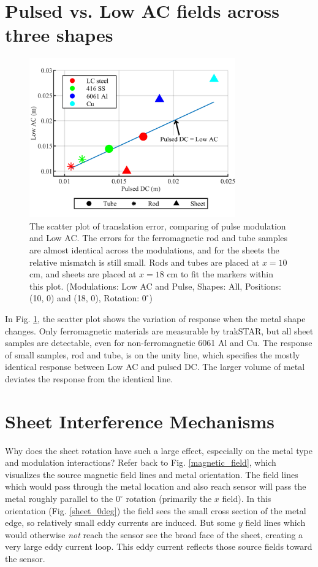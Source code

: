 \documentclass{article}
\begin{document}
\section{Pulsed vs. Low AC fields across three shapes}
\label{supplement:pulse_Low}

\begin{figure}[!htbp]
\centerline{\includegraphics[width= 3.5in]{chaicS2.png}}
\caption{The scatter plot of translation error, comparing of pulse modulation and Low AC. The errors for the ferromagnetic rod and tube samples are almost identical across the modulations, and for the sheets the relative mismatch is still small.  Rods and tubes are placed at $x=10$ cm, and sheets are placed at $x=18$ cm to fit the markers within this plot.
(Modulations: Low AC and Pulse, Shapes: All, Positions: (10, 0) and (18, 0), Rotation: $0^\circ$)}
\label{3DGuidance_Low_compare}
\end{figure} 

In Fig. \ref{3DGuidance_Low_compare}, the scatter plot shows the variation of response when the metal shape changes. Only ferromagnetic materials are measurable by trakSTAR, but all sheet samples are detectable, even for non-ferromagnetic 6061 Al and Cu. The response of small samples, rod and tube, is on the unity line, which specifies the mostly identical response between Low AC and pulsed DC. The larger volume of metal deviates the response from the identical line. 

\section{Sheet Interference Mechanisms}
\label{supplement:sheet_interference}

Why does the sheet rotation have such a large effect, especially on the metal type and modulation interactions? Refer back to Fig. \ref{magnetic_field}, which visualizes the source magnetic field lines and metal orientation. The field lines which would pass through the metal location and also reach sensor will pass the metal roughly parallel to the $0^\circ$ rotation (primarily the $x$ field). In this orientation (Fig. \ref{sheet_0deg}) the field sees the small cross section of the metal edge, so relatively small eddy currents are induced. But some $y$ field lines which would otherwise \textit{not} reach the sensor see the broad face of the sheet, creating a very large eddy current loop. This eddy current reflects those source fields toward the sensor. 
 
\end{document}
